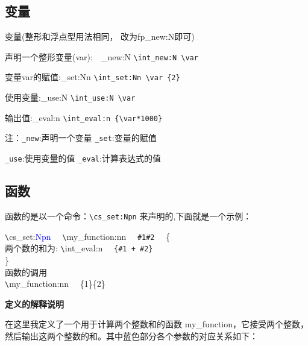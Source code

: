 \documentclass[fontset=windows]{article}
\begin{document}
\subsection{变量}
\vspace*{2em}
变量(整形和浮点型用法相同， 改为fp_new:N即可)\par 
声明一个整形变量(var):~~\int_new:N \var  \verb !\int_new:N \var! \par
变量var的赋值:\hspace*{4em}\int_set:Nn     \verb !\int_set:Nn \var {2} ! \par
使用变量:\int_use:N \var   \hspace*{6.5em}\verb !\int_use:N \var!\par
输出值:\int_eval:n {} \hspace*{6em}\verb!\int_eval:n {\var*1000}!

\par 
\noindent 注：\verb!_new!:声明一个变量 \hspace*{4em} \verb!_set!:变量的赋值
\par 
\verb |_use|:使用变量的值 \hspace*{4em}\verb|_eval|:计算表达式的值

\subsection{函数}

函数的是以一个命令：{\verb |\cs_set:Npn|} 来声明的,下面就是一个示例：

\par 
\begin{framed}
\verb|\|cs_set:\textcolor{blue}{Npn} ~~\verb |\|my_function:nn ~~\verb |#1#2| ~~\{\\
    \hspace*{4em}两个数的和为: \verb |\|int_eval:n ~~\verb |{#1 + #2}|\\
\hspace*{2em}\}\\
\hspace*{2em}函数的调用\\
\hspace*{2em}\verb |\|my_function:nn ~~\{1\}\{2\}
\end{framed}
\par
\bigskip
\textbf{定义的解释说明}
\par 
在这里我定义了一个用于计算两个整数和的函数 my_function，它接受两个整数，然后输出这两个整数的和。其中蓝色部分各个参数的对应关系如下：
\par 
\end{document}

